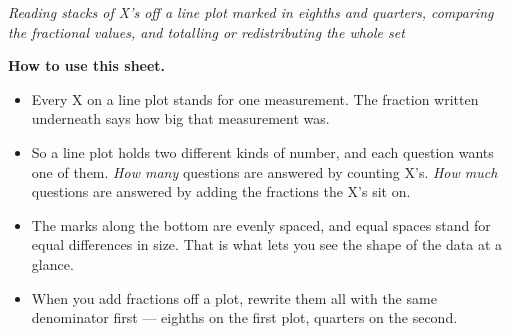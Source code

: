 \documentclass[12pt]{article}
\begin{document}
\newlength{\figcol}\setlength{\figcol}{0.50\linewidth}
\newlength{\qcol}\setlength{\qcol}{0.46\linewidth}

\begin{center}\small\textit{Reading stacks of X's off a line plot marked in eighths and
quarters, comparing the fractional values, and totalling or redistributing the whole
set}\end{center}

\noindent\small\textbf{How to use this sheet.}
\begin{itemize}[label={$\bullet$}, leftmargin=1.1cm, itemsep=1pt, topsep=2pt]
  \item Every \textsf{X} on a line plot stands for one measurement. The fraction written
        underneath says how big that measurement was.
  \item So a line plot holds two different kinds of number, and each question wants one of
        them. \emph{How many} questions are answered by counting \textsf{X}'s. \emph{How
        much} questions are answered by adding the fractions the \textsf{X}'s sit on.
  \item The marks along the bottom are evenly spaced, and equal spaces stand for equal
        differences in size. That is what lets you see the shape of the data at a glance.
  \item When you add fractions off a plot, rewrite them all with the same denominator first
        --- eighths on the first plot, quarters on the second.
\end{itemize}
\normalsize

\bigskip
\end{document}
